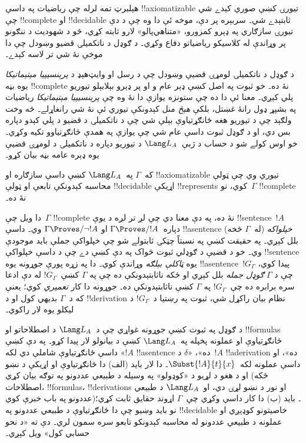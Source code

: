 \documentclass[../../../include/open-logic-section]{subfiles}
\begin{document}


هېلبرټ تمه لرله چې رياضيات په داسې !!{axiomatizable} تيورۍ کښې
صوري کېدے شي چې !!{complete} او !!{decidable} ثابتېدے شي۔ سربېره پر
دې، موخه ئې دا وه چې د دې تيورۍ سازګاري په ډېرو کمزورو،
«متناهي‌پالو» لارو ثابته کړي، څو د شهوديت د ننګونو پر وړاندې له
کلاسیکو رياضياتو دفاع وکړي۔ د ګوډل د ناتکميلۍ قضيو وښودل چې دا موخې
نۀ شي تر لاسه کېدے۔

د ګوډل د ناتکميلۍ لومړۍ قضيې وښودل چې د رسل او وايټ‌هېډ د
\emph{پرېنسيپيا مېتېماتيکا} يوه بڼه !!{complete} نۀ ده۔ خو ثبوت په
اصل کښې ډېر عام و او پر ډېرو بېلابېلو تيوريو پلي کېږي۔ معنا ئې دا ده
چې ستونزه يوازې دا نۀ وه چې \emph{پرېنسيپيا مېتېماتيکا} رياضيات په
بشپړ ډول رانۀ غښتل، بلکې \emph{هېڅ} منل کېدونکې تيوري ئې نۀ شي
رانغاړلے۔ څه وخت ولګېد چې د تيوريو هغه ځانګړتياوې بېلې شي چې د
ناتکميلۍ د قضيو د پلي کېدو دپاره بس دي، او د ګوډل ثبوت داسې عام شي
چې يوازې په همدې ځانګړتياوو تکيه وکړي۔ خو اوس کولے شو د حساب د
ژبې~$\Lang L_A$ د تيوريو دپاره د ناتکميلۍ د لومړۍ قضيې يوه ډېره عامه
بڼه بيان کړو۔

\begin{thm}
که~$\Gamma$ په~$\Lang L_A$ کښې داسې سازګاره او !!{axiomatizable}
تيوري وي چې ټولې محاسبه کېدونکې تابعې او ټولې !!{decidable} اړيکې
!!{represents} کوي، نو~$\Gamma$ !!{complete} نۀ ده۔
\end{thm}

دا ويل چې~$\Gamma$ !!{complete} نۀ ده، په دې معنا دي چې لږ تر لږه
د يوې !!{sentence}~$!A$ دپاره~$\Gamma \Proves/ !A$ او
$\Gamma \Proves/ \lnot !A$ وي۔ داسې !!a{sentence} (له~$\Gamma$
څخه) \emph{خپلواکه} بلل کېږي۔
په حقيقت کښې په نسبتاً چټکۍ ثابتولے شو
چې خپلواکې جملې بايد موجودې وي۔ خو د قضيې د ګوډلي ثبوت ځواک په دې کښې
دے چې د داسې خپلواکې !!{sentence} يوه \emph{ټاکلې بېلګه} وړاندې کوي۔
دا په زړه پورې جوړونه يوه !!a{sentence}~$!G_\Gamma$ پيدا کوي، چې د
$\Gamma$ \emph{ګوډل جمله} بلل کېږي او ځکه ناثابتېدونکې ده چې په
$\Gamma$ کښې~$!G_\Gamma$ له دې ادعا سره برابره ده چې~$!G_\Gamma$ په
$\Gamma$ کښې ناثابتېدونکې ده۔ جوړونه دا کار \emph{تعميري} کوي؛ يعنې
که د~$\Gamma$ بديهي کول او د !!{derivation} نظام بيان راکړل شي، ثبوت
په رښتيا د~$!G_\Gamma$ د ليکلو يوه لار راکوي۔

د ګوډل په ثبوت کښې جوړونه غواړي چې د~$\Lang L_A$ د اصطلاحاتو او
!!{formula}s ځانګړتياوې او عملونه پخپله په~$\Lang L_A$ کښې د بيانولو
لار پيدا کړو۔ په دې کښې داسې ځانګړتياوې شاملې دي لکه «$!A$
!!a{sentence} ده»، «$\delta$ د~$!A$ !!a{derivation} ده»، او داسې
عملونه لکه~$\Subst{!A}{t}{x}$۔ دا لار بايد (الف) دا ځانګړتياوې او
اړيکې د نښو او د هغو د لړيو د «کوډولو» په وسيله د طبيعي عددونو په
توګه بيان کړي (ځکه اصطلاحات، !!{formula}s، !!{derivation}s او نور د
نښو لړۍ دي، او~$\Lang L_A$ د طبيعي عددونو په باب خبرې کوي)۔ بايد
(ب) دا کار داسې وکړي چې~$\Gamma$ اړوند حقايق ثابت کړي؛ نو بايد وښيو
چې دا ځانګړتياوې د طبيعي عددونو په !!{decidable} خاصيتونو کوډېږي او
عملونه د طبيعي عددونو له محاسبه کېدونکو تابعو سره سمون لري۔ دې ته
«د نحو حسابي کول» ويل کېږي۔
\end{document}
